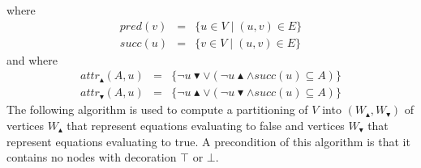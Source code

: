 where%
\begin{eqnarray*}
pred(v) &=&\{u\in V\mid (u,v)\in E\} \\
succ(u) &=&\{v\in V\mid (u,v)\in E\}
\end{eqnarray*}%
and where%
\begin{eqnarray*}
attr_{\blacktriangle }(A,u) &=&\{\lnot u\blacktriangledown \vee \left( \lnot
u\blacktriangle \wedge succ(u)\subseteq A\right) \} \\
attr_{\blacktriangledown }(A,u) &=&\{\lnot u\blacktriangle \vee \left( \lnot
u\blacktriangledown \wedge succ(u)\subseteq A\right) \}
\end{eqnarray*}%
The following algorithm is used to compute a partitioning of $V$ into $%
\left( W_{\blacktriangle },W_{\blacktriangledown }\right) $ of vertices $%
W_{\blacktriangle }$ that represent equations evaluating to false and
vertices $W_{\blacktriangledown }$ that represent equations evaluating to
true. A precondition of this algorithm is that it contains no nodes with
decoration $\top $ or $\bot $.%
